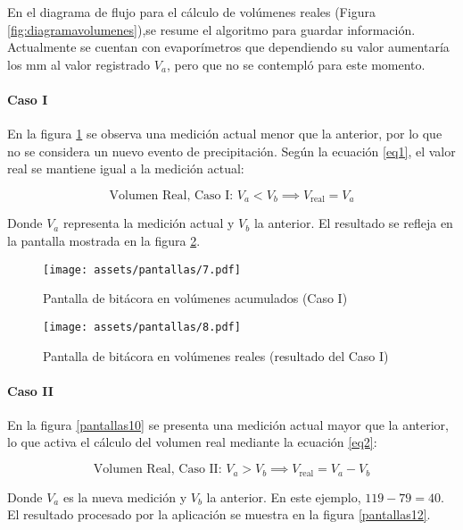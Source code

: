 En el diagrama de flujo para el cálculo de volúmenes reales (Figura \ref{fig:diagramavolumenes}),se resume el algoritmo para guardar información. Actualmente se cuentan con evaporímetros que dependiendo su valor aumentaría los mm al valor registrado $V_a$, pero que no se contempló para este momento.

\paragraph{Caso I}

En la figura \ref{pantallas7} se observa una medición actual menor que la anterior, por lo que no se considera un nuevo evento de precipitación. Según la ecuación \ref{eq1}, el valor real se mantiene igual a la medición actual:

\begin{equation}
\text{Volumen Real, Caso I: } V_{a} < V_{b} \implies V_{\text{real}} = V_{a}
\label{eq1}
\end{equation}

Donde $V_{a}$ representa la medición actual y $V_{b}$ la anterior. El resultado se refleja en la pantalla mostrada en la figura \ref{pantallas8}.

\begin{figure}[h!]
\centering
\texttt{[image: assets/pantallas/7.pdf]}
\caption{Pantalla de bitácora en volúmenes acumulados (Caso I)}
\label{pantallas7}
\end{figure}

\begin{figure}[h!]
\centering
\texttt{[image: assets/pantallas/8.pdf]}
\caption{Pantalla de bitácora en volúmenes reales (resultado del Caso I)}
\label{pantallas8}
\end{figure}

\paragraph{Caso II}

En la figura \ref{pantallas10} se presenta una medición actual mayor que la anterior, lo que activa el cálculo del volumen real mediante la ecuación \ref{eq2}:

\begin{equation}
\text{Volumen Real, Caso II: } V_{a} > V_{b} \implies V_{\text{real}} = V_{a} - V_{b}
\label{eq2}
\end{equation}

Donde $V_{a}$ es la nueva medición y $V_{b}$ la anterior. En este ejemplo, $119 - 79 = 40$. El resultado procesado por la aplicación se muestra en la figura \ref{pantallas12}.

